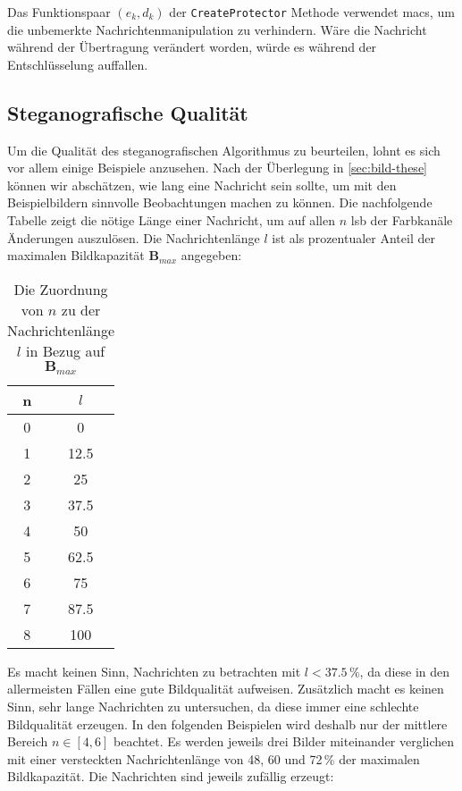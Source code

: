 \noindent
Das Funktionspaar $(e_k, d_k)$ der \texttt{CreateProtector} Methode verwendet \acp{mac},
um die unbemerkte Nachrichtenmanipulation zu verhindern. Wäre die Nachricht während der Übertragung
verändert worden, würde es während der Entschlüsselung auffallen.

\newcommand{\bmax}{\ensuremath{\mathbf{B}_{max}}}

\subsection{Steganografische Qualität}
Um die Qualität des steganografischen Algorithmus zu beurteilen,
lohnt es sich vor allem einige
Beispiele anzusehen.
Nach der Überlegung in \autoref{sec:bild-these} können wir abschätzen,
wie lang eine Nachricht sein sollte, um mit
den Beispielbildern sinnvolle Beobachtungen machen zu können.
Die nachfolgende Tabelle
zeigt die nötige Länge einer Nachricht, um auf allen $n$ \acs{lsb}
der Farbkanäle Änderungen auszulösen.
Die Nachrichtenlänge $l$ ist als prozentualer Anteil
der maximalen Bildkapazität $\bmax$ angegeben:
\begin{table}[h]
  \centering
  \caption{Die Zuordnung von $n$ zu der Nachrichtenlänge $l$ in Bezug auf $\bmax$}
  \begin{tabular}{|c|c|}
    \hline
    n & $l$        \\ \hline
    0 & \num{0}    \\ \hline
    1 & \num{12,5} \\ \hline
    2 & \num{25}   \\ \hline
    3 & \num{37,5} \\ \hline
    4 & \num{50}   \\ \hline
    5 & \num{62,5} \\ \hline
    6 & \num{75}   \\ \hline
    7 & \num{87,5} \\ \hline
    8 & \num{100}  \\ \hline
  \end{tabular}
  \label{tab:zuordnung-n-bmax}
\end{table}

\noindent
Es macht keinen Sinn, Nachrichten zu betrachten mit $l < \num{37.5}\,\%$,
da diese in den allermeisten Fällen eine gute Bildqualität aufweisen.
Zusätzlich macht es keinen Sinn, sehr lange Nachrichten zu
untersuchen, da diese immer eine schlechte Bildqualität erzeugen.
In den folgenden Beispielen wird deshalb nur der mittlere Bereich $n \in [4,6]$ beachtet.
Es werden jeweils drei Bilder miteinander verglichen mit einer
versteckten Nachrichtenlänge von 48, 60 und 72\,\% der maximalen Bildkapazität.
Die Nachrichten sind jeweils zufällig erzeugt:

